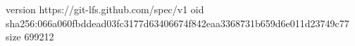 version https://git-lfs.github.com/spec/v1
oid sha256:066a060fbddead03fc3177d63406674f842eaa3368731b659d6e011d23749c77
size 699212
